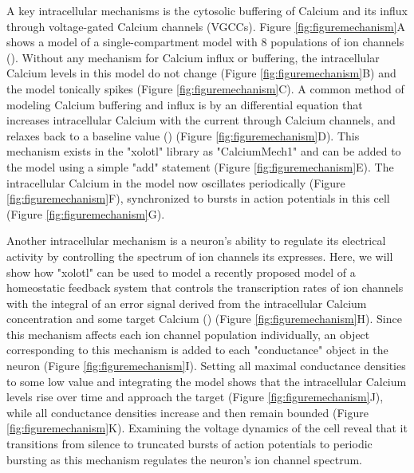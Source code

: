 \documentclass{frontiersSCNS} %
\begin{document}
A key intracellular mechanisms is the cytosolic buffering of Calcium and its influx through voltage-gated Calcium channels (VGCCs). Figure \ref{fig:figuremechanism}A shows a model of a single-compartment model with 8 populations of ion channels (\cite{liuModelNeuronActivityDependent1998}). Without any mechanism for Calcium influx or buffering, the intracellular Calcium levels in this model do not change (Figure \ref{fig:figuremechanism}B) and the model tonically spikes (Figure \ref{fig:figuremechanism}C). A common method of modeling Calcium buffering and influx is by an differential equation that increases intracellular Calcium with the current through Calcium channels, and relaxes back to a baseline value (\cite{liuModelNeuronActivityDependent1998, prinzAlternativeHandtuningConductancebased2003, dayanTheoreticalNeuroscience2001}) (Figure \ref{fig:figuremechanism}D). This mechanism exists in the "xolotl" library as "CalciumMech1" and can be added to the model using a simple "add" statement (Figure \ref{fig:figuremechanism}E). The intracellular Calcium in the model now oscillates periodically (Figure \ref{fig:figuremechanism}F), synchronized to bursts in action potentials in this cell (Figure \ref{fig:figuremechanism}G).

Another intracellular mechanism is a neuron's ability to regulate its electrical activity by controlling the spectrum of ion channels its expresses. Here, we will show how "xolotl" can be used to model a recently proposed model of a homeostatic feedback system that controls the transcription rates of ion channels with the integral of an error signal derived from the intracellular Calcium concentration and some target Calcium (\cite{olearyCorrelationsIonChannel2013, olearyCellTypesNetwork2014}) (Figure \ref{fig:figuremechanism}H). Since this mechanism affects each ion channel population individually, an object corresponding to this mechanism is added to each "conductance" object in the neuron (Figure \ref{fig:figuremechanism}I). Setting all maximal conductance densities to some low value and integrating the model shows that the intracellular Calcium levels rise over time and approach the target (Figure \ref{fig:figuremechanism}J), while all conductance densities increase and then remain bounded (Figure \ref{fig:figuremechanism}K). Examining the voltage dynamics of the cell reveal that it transitions from silence to truncated bursts of action potentials to periodic bursting as this mechanism regulates the neuron's ion channel spectrum.
\end{document}
